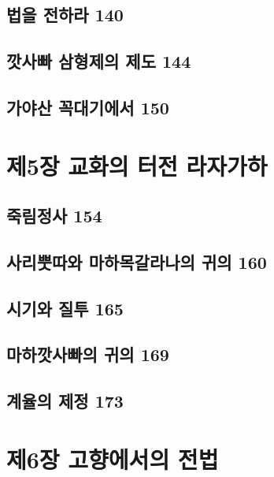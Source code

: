 \documentclass[12pt, a4paper, oneside]{book}
\let\stdsection\section
\renewcommand\section{\newpage\stdsection}
\begin{document}
	\section{법을 전하라 140 }

	\section{깟사빠 삼형제의 제도 144 }

	\section{가야산 꼭대기에서 150}





	\chapter{제5장 교화의 터전 라자가하}
	\noptcrule
	\parttoc				

	\section{죽림정사 154 }

	\section{사리뿟따와 마하목갈라나의 귀의 160 }

	\section{시기와 질투 165 }

	\section{마하깟사빠의 귀의 169 }

	\section{계율의 제정 173}





	\chapter{제6장 고향에서의 전법}
	\noptcrule
	\parttoc				
\end{document}

